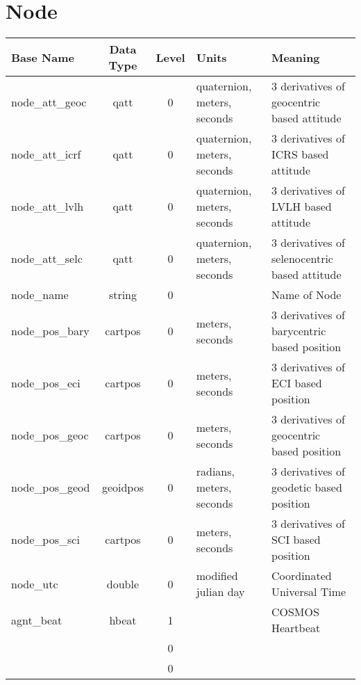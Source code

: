 \documentclass[10pt,letterpaper]{report}
\begin{document}
\section{Node}
\begin{tabular}{|l|c|c|l|l|}
\hline \textbf{Base Name} &\textbf{Data Type}  & \textbf{Level} & \textbf{Units} & \textbf{Meaning}\\ 
\hline node\_att\_geoc & qatt & 0 & quaternion, meters, seconds & 3 derivatives of geocentric based attitude\\ 
\hline node\_att\_icrf & qatt & 0 & quaternion, meters, seconds & 3 derivatives of ICRS based attitude \\ 
\hline node\_att\_lvlh & qatt & 0 & quaternion, meters, seconds & 3 derivatives of LVLH based attitude \\ 
\hline node\_att\_selc & qatt & 0 & quaternion, meters, seconds & 3 derivatives of selenocentric based attitude \\ 
\hline node\_name & string & 0 &  & Name of Node \\ 
\hline node\_pos\_bary & cartpos & 0 & meters, seconds & 3 derivatives of barycentric based position \\ 
\hline node\_pos\_eci & cartpos & 0 & meters, seconds & 3 derivatives of ECI based position \\ 
\hline node\_pos\_geoc & cartpos & 0 & meters, seconds & 3 derivatives of geocentric based position \\ 
\hline node\_pos\_geod & geoidpos & 0 & radians, meters, seconds & 3 derivatives of geodetic based position \\ 
\hline node\_pos\_sci & cartpos & 0 & meters, seconds & 3 derivatives of SCI based position \\ 
\hline node\_utc & double & 0 & modified julian day & Coordinated Universal Time \\ 
\hline agnt\_beat & hbeat & 1 &  & COSMOS Heartbeat \\ 
\hline  &  & 0 &  &  \\ 
\hline  &  & 0 &  &  \\ 
\hline 
\end{tabular} 
\end{document}

